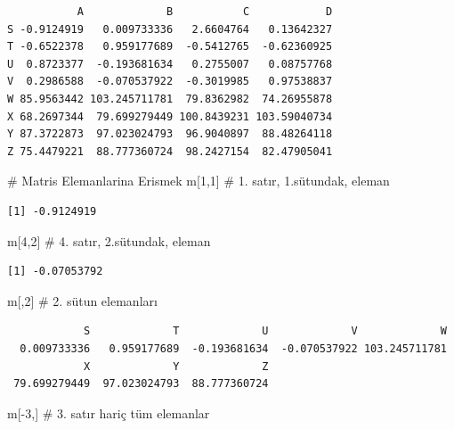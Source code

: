 \documentclass[
  letterpaper,
  DIV=11,
  numbers=noendperiod]{scrreprt}
\newenvironment{Shaded}{\begin{snugshade}}{\end{snugshade}}
\newcommand{\CommentTok}[1]{\textcolor[rgb]{0.37,0.37,0.37}{#1}}
\newcommand{\DecValTok}[1]{\textcolor[rgb]{0.68,0.00,0.00}{#1}}
\newcommand{\NormalTok}[1]{\textcolor[rgb]{0.00,0.23,0.31}{#1}}
\newcommand{\SpecialCharTok}[1]{\textcolor[rgb]{0.37,0.37,0.37}{#1}}
\begin{document}
\begin{verbatim}
           A             B           C            D
S -0.9124919   0.009733336   2.6604764   0.13642327
T -0.6522378   0.959177689  -0.5412765  -0.62360925
U  0.8723377  -0.193681634   0.2755007   0.08757768
V  0.2986588  -0.070537922  -0.3019985   0.97538837
W 85.9563442 103.245711781  79.8362982  74.26955878
X 68.2697344  79.699279449 100.8439231 103.59040734
Y 87.3722873  97.023024793  96.9040897  88.48264118
Z 75.4479221  88.777360724  98.2427154  82.47905041
\end{verbatim}

\begin{Shaded}
\begin{Highlighting}[]
\CommentTok{\# Matris Elemanlarina Erismek}
\NormalTok{m[}\DecValTok{1}\NormalTok{,}\DecValTok{1}\NormalTok{] }\CommentTok{\# 1. satır, 1.sütundak, eleman}
\end{Highlighting}
\end{Shaded}

\begin{verbatim}
[1] -0.9124919
\end{verbatim}

\begin{Shaded}
\begin{Highlighting}[]
\NormalTok{m[}\DecValTok{4}\NormalTok{,}\DecValTok{2}\NormalTok{] }\CommentTok{\# 4. satır, 2.sütundak, eleman}
\end{Highlighting}
\end{Shaded}

\begin{verbatim}
[1] -0.07053792
\end{verbatim}

\begin{Shaded}
\begin{Highlighting}[]
\NormalTok{m[,}\DecValTok{2}\NormalTok{] }\CommentTok{\# 2. sütun elemanları}
\end{Highlighting}
\end{Shaded}

\begin{verbatim}
            S             T             U             V             W 
  0.009733336   0.959177689  -0.193681634  -0.070537922 103.245711781 
            X             Y             Z 
 79.699279449  97.023024793  88.777360724 
\end{verbatim}

\begin{Shaded}
\begin{Highlighting}[]
\NormalTok{m[}\SpecialCharTok{{-}}\DecValTok{3}\NormalTok{,] }\CommentTok{\# 3. satır hariç tüm elemanlar}
\end{Highlighting}
\end{Shaded}
\end{document}
